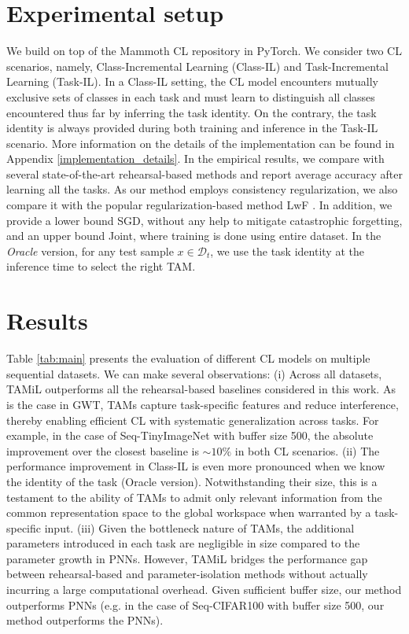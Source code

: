 \documentclass{article} %
\begin{document}
\section{Experimental setup}
We build on top of the Mammoth \citep{buzzega2020dark} CL repository in PyTorch. We consider two CL scenarios, namely, Class-Incremental Learning (Class-IL) and Task-Incremental Learning (Task-IL). In a Class-IL setting, the CL model encounters mutually exclusive sets of classes in each task and must learn to distinguish all classes encountered thus far by inferring the task identity. On the contrary, the task identity is always provided during both training and inference in the Task-IL scenario. More information on the details of the implementation can be found in Appendix \ref{implementation_details}. In the empirical results, we compare with several state-of-the-art rehearsal-based methods and report average accuracy after learning all the tasks. As our method employs consistency regularization, we also compare it with the popular regularization-based method LwF \citep{li2017learning}. 
In addition, we provide a lower bound SGD, without any help to mitigate catastrophic forgetting, and an upper bound Joint, where training is done using entire dataset. In the \textit{Oracle} version, for any test sample $x \in \mathcal{D}_t$, we use the task identity at the inference time to select the right TAM.


\section{Results}
Table \ref{tab:main} presents the evaluation of different CL models on multiple sequential datasets. We can make several observations: (i) Across all datasets, TAMiL outperforms all the rehearsal-based baselines considered in this work. As is the case in GWT, TAMs capture task-specific features and reduce interference, thereby enabling efficient CL with systematic generalization across tasks. For example, in the case of Seq-TinyImageNet with buffer size 500, the absolute improvement over the closest baseline is $\sim10\%$ in both CL scenarios. (ii) The performance improvement in Class-IL is even more pronounced when we know the identity of the task (Oracle version). Notwithstanding their size, this is a testament to the ability of TAMs to admit only relevant information from the common representation space to the global workspace when warranted by a task-specific input. (iii) Given the bottleneck nature of TAMs, the additional parameters introduced in each task are negligible in size compared to the parameter growth in PNNs. However, TAMiL bridges the performance gap between rehearsal-based and parameter-isolation methods without actually incurring a large computational overhead.  Given sufficient buffer size, our method outperforms PNNs (e.g. in the case of Seq-CIFAR100 with buffer size 500, our method outperforms the PNNs). 
\end{document}
